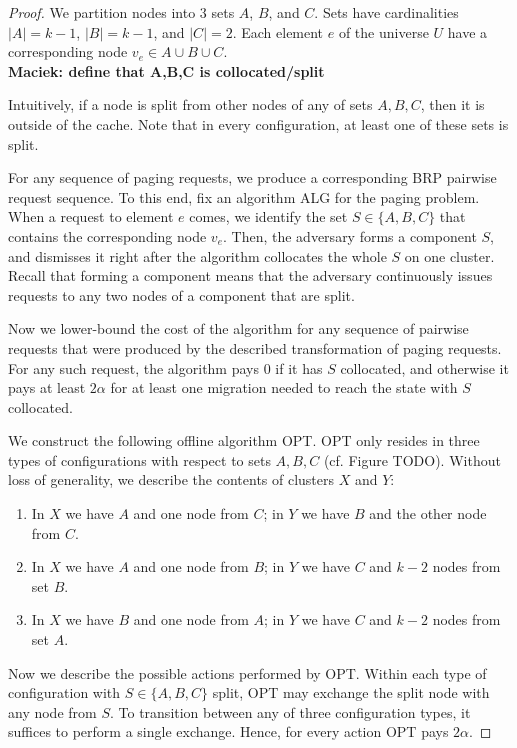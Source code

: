 \documentclass[manuscript,screen=true, review, anonymous]{acmart}
\newcommand\maciek[1]{\color{brown}\textbf{\\ Maciek: #1}\color{black}}
\begin{document}
\begin{proof}
We partition nodes into $3$ sets $A$, $B$, and $C$.
Sets have cardinalities $|A| = k-1$, $|B| = k-1$, and $|C| = 2$.
Each element $e$ of the universe $U$ have a corresponding node $v_e \in A\cup B\cup C$.
\maciek{define that A,B,C is collocated/split}

Intuitively, if a node is split from other nodes of any of sets $A,B,C$, then it is outside of the cache.
Note that in every configuration, at least one of these sets is split.

For any sequence of paging requests, we produce a corresponding BRP pairwise request sequence.
To this end, fix an algorithm ALG for the paging problem.
When a request to element $e$ comes, we identify the set $S \in \{ A,B,C \}$ that contains the corresponding node $v_e$.
Then, the adversary forms a component $S$, and dismisses it right after the algorithm collocates the whole $S$ on one cluster.
Recall that forming a component means that the adversary continuously issues requests to any two nodes of a component that are split.

Now we lower-bound the cost of the algorithm for any sequence of pairwise requests that were produced by the described transformation of paging requests.
For any such request, the algorithm pays $0$ if it has $S$ collocated, and otherwise it pays at least $2\alpha$ for at least one migration needed to reach the state with $S$ collocated.

We construct the following offline algorithm OPT.
OPT only resides in three types of configurations with respect to sets $A,B,C$ (cf. Figure TODO).
Without loss of generality, we describe the contents of clusters $X$ and $Y$:
\begin{enumerate}
  \item In $X$ we have $A$ and one node from $C$; in $Y$ we have $B$ and the other node from $C$.
  \item In $X$ we have $A$ and one node from $B$; in $Y$ we have $C$ and $k-2$ nodes from set $B$.
  \item In $X$ we have $B$ and one node from $A$; in $Y$ we have $C$ and $k-2$ nodes from set $A$.
\end{enumerate}

Now we describe the possible actions performed by OPT.
Within each type of configuration with $S \in \{ A, B, C\}$ split, OPT may exchange the split node with any node from $S$.
To transition between any of three configuration types, it suffices to perform a single exchange.
Hence, for every action OPT pays $2\alpha$.


\end{proof}
\end{document}
